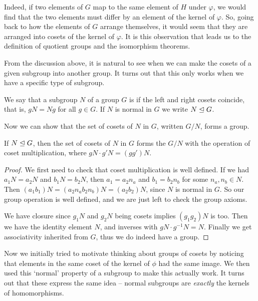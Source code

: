 \documentclass[a4paper]{scrartcl}
\begin{document}
Indeed, if two elements of $G$ map to the same element of $H$ under $\varphi$, we would find that the two elements must differ by an element of the kernel of $\varphi$. So, going back to how the elements of $G$ arrange themselves, it would seem that they are arranged into cosets of the kernel of $\varphi$. It is this observation that leads us to the definition of quotient groups and the isomorphism theorems.


From the discussion above, it is natural to see when we can make the cosets of a given subgroup into another group. It turns out that this only works when we have a specific type of subgroup.

\begin{definition}
	We say that a subgroup $N$ of a group $G$ is  if the left and right cosets coincide, that is, $gN = Ng$ for all $g \in G$. If $N$ is normal in $G$ we write $N \trianglelefteq G$.
\end{definition}

Now we can show that the set of cosets of $N$ in $G$, written $G/N$, forms a group.

\begin{theorem}
	If $N \trianglelefteq G$, then the set of cosets of $N$ in $G$ forms the  $G/N$ with the operation of coset multiplication, where $gN \cdot g'N = (g g')N$.
\end{theorem}
\begin{proof}
	We first need to check that coset multiplication is well defined. If we had $a_1 N = a_2N$ and $b_1 N = b_2 N$, then $a_1 = a_2 n_a$ and $b_1 = b_2 n_b$ for some $n_a, n_b \in N$. Then $(a_1 b_1)N = (a_2 n_a b_2 n_b)N = (a_2 b_2)N$, since $N$ is normal in $G$. So our group operation is well defined, and we are just left to check the group axioms.

	We have closure since $g_1 N$ and $g_2N$ being cosets implies $(g_1 g_2)N$ is too. Then we have the identity element $N$, and inverses with $gN \cdot g^{-1}N = N$. Finally we get associativity inherited from $G$, thus we do indeed have a group.
\end{proof}

Now we initially tried to motivate thinking about groups of cosets by noticing that elements in the same coset of the kernel of $\phi$ had the same image. We then used this `normal' property of a subgroup to make this actually work. It turns out that these express the same idea -- normal subgroups are \emph{exactly} the kernels of homomorphisms.
\end{document}
